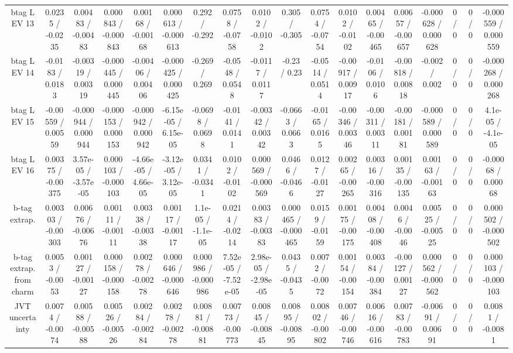 \documentclass[10pt]{article}
\begin{document}
\begin{table}[htbp]
\begin{center}
\begin{tabular}{|c|c|c|c|c|c|c|c|c|c|c|c|c|c|c|c|c|c|}
  btag L EV 13 & 0.0235 / -0.0235 & 0.00483 / -0.00483 & 0.000843 / -0.000843 & 0.00168 / -0.00168 & 0.000613 / -0.000613 & 0.292 / -0.292 & 0.0758 / -0.0758 & 0.0102 / -0.0102 & 0.305 / -0.305 & 0.0754 / -0.0754 & 0.0102 / -0.0102 & 0.00465 / -0.00465 & 0.00657 / -0.00657 & -0.000628 / 0.000628 & 0 / 0 & 0 / 0 & -0.000559 / 0.000559 \\ 
  btag L EV 14 & -0.0183 / 0.0183 & -0.00319 / 0.00319 & -0.000445 / 0.000445 & -0.00406 / 0.00406 & -0.000425 / 0.000425 & -0.269 / 0.269 & -0.0548 / 0.0548 & -0.0117 / 0.0117 & -0.23 / 0.23 & -0.0514 / 0.0514 & -0.00917 / 0.00917 & -0.0106 / 0.0106 & -0.00818 / 0.00818 & -0.002 / 0.002 & 0 / 0 & 0 / 0 & -0.000268 / 0.000268 \\ 
  btag L EV 15 & -0.00559 / 0.00559 & -0.000944 / 0.000944 & -0.000153 / 0.000153 & -0.000942 / 0.000942 & -6.15e-05 / 6.15e-05 & -0.0698 / 0.0698 & -0.0141 / 0.0141 & -0.00342 / 0.00342 & -0.0663 / 0.0663 & -0.0165 / 0.0165 & -0.00346 / 0.00346 & -0.00311 / 0.00311 & -0.00181 / 0.00181 & -0.000589 / 0.000589 & 0 / 0 & 0 / 0 & 4.1e-05 / -4.1e-05 \\ 
  btag L EV 16 & 0.00375 / -0.00375 & 3.57e-05 / -3.57e-05 & 0.000103 / -0.000103 & -4.66e-05 / 4.66e-05 & -3.12e-05 / 3.12e-05 & 0.0341 / -0.0341 & 0.0102 / -0.0102 & 0.000569 / -0.000569 & 0.0466 / -0.0466 & 0.0127 / -0.0127 & 0.00265 / -0.00265 & 0.00316 / -0.00316 & 0.00135 / -0.00135 & 0.00163 / -0.00163 & 0 / 0 & 0 / 0 & -0.00068 / 0.00068 \\ 
  b-tag extrap. & 0.00303 / -0.00303 & 0.00676 / -0.00676 & 0.00111 / -0.00111 & 0.00338 / -0.00338 & 0.00117 / -0.00117 & 1.1e-05 / -1.1e-05 & 0.0214 / -0.0214 & 0.00383 / -0.00383 & 0.000465 / -0.000465 & 0.0159 / -0.0159 & 0.00175 / -0.00175 & 0.00408 / -0.00408 & 0.0046 / -0.0046 & 0.00525 / -0.00525 & 0 / 0 & 0 / 0 & 0.000502 / -0.000502 \\ 
  b-tag extrap. from charm & 0.0053 / -0.0053 & 0.00127 / -0.00127 & 0.000158 / -0.000158 & 0.00278 / -0.00278 & 0.000646 / -0.000646 & 0.000986 / -0.000986 & 7.52e-05 / -7.52e-05 & 2.98e-05 / -2.98e-05 & 0.0435 / -0.0435 & 0.0072 / -0.0072 & 0.00154 / -0.00154 & 0.00384 / -0.00384 & -0.00127 / 0.00127 & 0.000562 / -0.000562 & 0 / 0 & 0 / 0 & 0.000103 / -0.000103 \\ 
  JVT uncertainty & 0.0074 / -0.0074 & 0.00588 / -0.00588 & 0.00526 / -0.00526 & 0.00284 / -0.00284 & 0.00278 / -0.00278 & 0.00881 / -0.00881 & 0.00773 / -0.00773 & 0.00845 / -0.00845 & 0.00895 / -0.00895 & 0.00802 / -0.00802 & 0.00746 / -0.00746 & 0.00616 / -0.00616 & 0.00783 / -0.00783 & -0.00691 / 0.00691 & 0 / 0 & 0 / 0 & 0.0081 / -0.0081 \\ 

\end{tabular}
\end{center}
\end{table}
\end{document}
